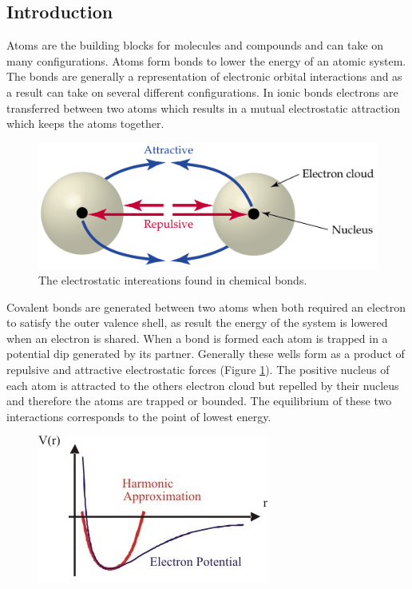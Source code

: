 \documentclass[hidelinks]{article}
\begin{document}
\begin{multicols}{2} %

\section{Introduction}


Atoms are the building blocks for molecules and compounds and can take on many configurations. Atoms form bonds to lower the energy of an atomic system. The bonds are generally a representation of electronic orbital interactions and as a result can take on several different configurations. In ionic bonds electrons are transferred between two atoms which results in a mutual electrostatic attraction which keeps the atoms together. 
\begin{figure}[H]
\centering
\includegraphics[width=\linewidth]{cloud}
\caption{The electrostatic intereations found in chemical bonds.\cite{2}}
\label{fig1}
\end{figure}
Covalent bonds are generated between two atoms when both required an electron to satisfy the outer valence shell, as result the energy of the system is lowered when an electron is shared. When a bond is formed each atom is trapped in a potential dip generated by its partner. Generally these wells form as a product of repulsive and attractive electrostatic forces (Figure \ref{fig1}). The positive nucleus of each atom is attracted to the others electron cloud but repelled by their nucleus and therefore the atoms are trapped or bounded. The equilibrium of these two interactions corresponds to the point of lowest energy.
\begin{figure}[H]
\centering
\includegraphics[width=\linewidth]{harm}

\end{figure}
\end{multicols}
\end{document}
